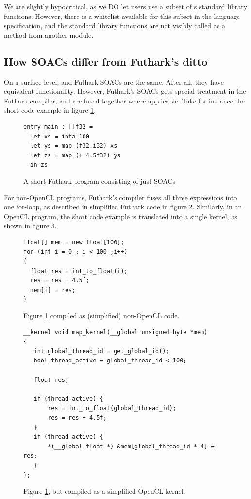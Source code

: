 We are slightly hypocritical, as we DO let users use a subset of \fsharp{}s
standard library functions. However, there is a whitelist available for this
subset in the \fshark{} language specification, and the standard library
functions are not visibly called as a method from another module.

\subsection*{How \fshark{} SOACs differ from Futhark's ditto}
On a surface level, \fshark{} and Futhark SOACs are the same. After all, they
have equivalent functionality.
However, Futhark's SOACs gets special treatment in the Futhark compiler, and are
fused together where applicable.
Take for instance the short code example in figure \ref{fig:futharkfusion}.

\begin{figure}[h]
  \centering
\begin{lstlisting}[language=Futhark]
entry main : []f32 =
  let xs = iota 100
  let ys = map (f32.i32) xs
  let zs = map (+ 4.5f32) ys
  in zs
\end{lstlisting}
  \caption{A short Futhark program consisting of just SOACs}
  \label{fig:futharkfusion}
\end{figure}

For non-OpenCL programs, Futhark's compiler fuses all three expressions into one for-loop, as described
in simplified Futhark \csharp{} code in figure \ref{fig:pseudofusion}.
Similarly, in an OpenCL program, the short code example is translated into a
single kernel, as shown in figure \ref{fig:pseudokernel}.

\begin{figure}[h]
  \centering
\begin{verbatim}
float[] mem = new float[100];
for (int i = 0 ; i < 100 ;i++)
{
  float res = int_to_float(i);
  res = res + 4.5f;
  mem[i] = res;
}
\end{verbatim}
  \caption{Figure \ref{fig:futharkfusion} compiled as (simplified) non-OpenCL
    \csharp{} code.}
  \label{fig:pseudofusion}
\end{figure}

\begin{figure}
  \centering
\begin{verbatim}
__kernel void map_kernel(__global unsigned byte *mem)
{
   int global_thread_id = get_global_id();
   bool thread_active = global_thread_id < 100;

   float res;

   if (thread_active) {
       res = int_to_float(global_thread_id);
       res = res + 4.5f;
   }
   if (thread_active) {
       *(__global float *) &mem[global_thread_id * 4] = res;
   }
};
\end{verbatim}
  \caption{Figure \ref{fig:futharkfusion}, but compiled as a simplified OpenCL kernel.}
  \label{fig:pseudokernel}
\end{figure}


